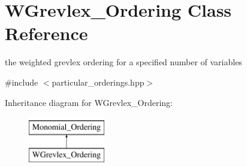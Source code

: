 \hypertarget{class_w_grevlex___ordering}{}\section{W\+Grevlex\+\_\+\+Ordering Class Reference}
\label{class_w_grevlex___ordering}


the weighted grevlex ordering for a specified number of variables  




{\ttfamily \#include $<$particular\+\_\+orderings.\+hpp$>$}

Inheritance diagram for W\+Grevlex\+\_\+\+Ordering\+:\begin{figure}[H]
\begin{center}
\leavevmode
\includegraphics[height=2.000000cm]{class_w_grevlex___ordering}
\end{center}
\end{figure}
